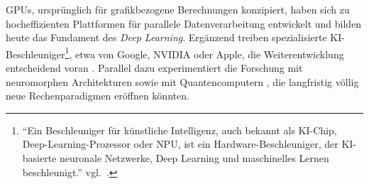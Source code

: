 GPUs, ursprünglich für grafikbezogene Berechnungen konzipiert, haben sich zu hocheffizienten Plattformen für parallele Datenverarbeitung entwickelt und bilden heute das Fundament des \textit{Deep Learning}. Ergänzend treiben spezialisierte KI-Beschleuniger\footnote{\enquote{Ein Beschleuniger für künstliche Intelligenz, auch bekannt als KI-Chip, Deep-Learning-Prozessor oder \ac{NPU}, ist ein Hardware-Beschleuniger, der KI-basierte neuronale Netzwerke, Deep Learning und maschinelles Lernen beschleunigt.} vgl.~\cite{ibm_was_2024}.}, etwa von Google, NVIDIA oder Apple, die Weiterentwicklung entscheidend voran \cite{richsrdson_10_2025}. Parallel dazu experimentiert die Forschung mit neuromorphen Architekturen \parencite[S.~22]{schuman_survey_2017} sowie mit Quantencomputern \parencite[S.~2f]{preskill_quantum_2018}, die langfristig völlig neue Rechenparadigmen eröffnen könnten.  


